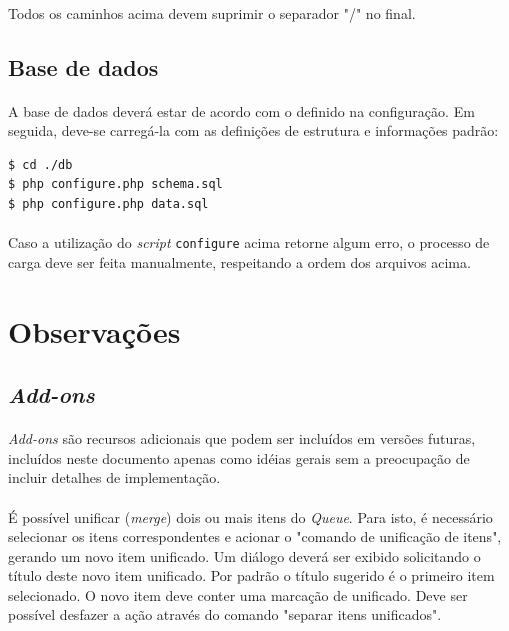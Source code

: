 \documentclass[a4paper,12pt]{article}
\def\queue{\emph{Queue}}
\begin{document}
\paragraph{}
Todos os caminhos acima devem suprimir o separador "/" no final.

\subsection{Base de dados}

\paragraph{}
A base de dados deverá estar de acordo com o definido na configuração. Em seguida, deve-se carregá-la com as definições de estrutura e informações padrão:

\begin{verbatim}
$ cd ./db
$ php configure.php schema.sql
$ php configure.php data.sql
\end{verbatim}

\paragraph{}
Caso a utilização do \emph{script} \texttt{configure} acima retorne algum erro, o processo de carga deve ser feita manualmente, respeitando a ordem dos arquivos acima.


\appendix

\section{Observações}

\subsection{\emph{Add-ons}}

\paragraph{}
\emph{Add-ons} são recursos adicionais que podem ser incluídos em versões
futuras, incluídos neste documento apenas como idéias gerais sem a preocupação
de incluir detalhes de implementação.

\paragraph{}
É possível unificar (\emph{merge}) dois ou mais itens do \queue{}. Para isto, é
necessário selecionar os itens correspondentes e acionar o "comando de
unificação de itens", gerando um novo item unificado. Um diálogo deverá ser
exibido solicitando o título deste novo item unificado. Por padrão o título
sugerido é o primeiro item selecionado. O novo item deve conter uma marcação de
unificado. Deve ser possível desfazer a ação através do comando "separar itens
unificados".
\end{document}
